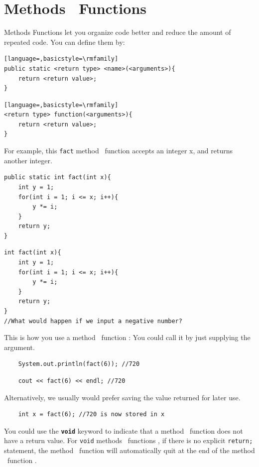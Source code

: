 \section{\if{} Methods \else ~Functions \fi}
\label{sec:functions}

\if{} Methods \else Functions \fi let you organize code better and reduce the amount of repeated code. You can define them by:

\if{}
\begin{lstlisting}[language=,basicstyle=\rmfamily]
public static <return type> <name>(<arguments>){
    return <return value>;
}
\end{lstlisting}
\else
\begin{lstlisting}[language=,basicstyle=\rmfamily]
<return type> function(<arguments>){
    return <return value>;
}
\end{lstlisting}
\fi

For example, this \texttt{fact}\if{} method \else ~function \fi accepts an integer x, and returns another integer.
\if{}
\begin{lstlisting}
public static int fact(int x){
    int y = 1;
    for(int i = 1; i <= x; i++){
        y *= i;
    }
    return y;
}
\end{lstlisting}
\else
\begin{lstlisting}
int fact(int x){
    int y = 1;
    for(int i = 1; i <= x; i++){
        y *= i;
    }
    return y;
}
//What would happen if we input a negative number?
\end{lstlisting}
\fi

This is how you use a\if{} method \else ~function \fi: 
You could call it by just supplying the argument.

\if{}
\begin{lstlisting}
    System.out.println(fact(6)); //720
\end{lstlisting}
\else
\begin{lstlisting}
    cout << fact(6) << endl; //720
\end{lstlisting}
\fi

Alternatively, we usually would prefer saving the value returned for later use.

\begin{lstlisting}
    int x = fact(6); //720 is now stored in x
\end{lstlisting}

You could use the \texttt{\textbf{void}} keyword to indicate that a\if{} method \else ~function \fi does not have a return value. For \texttt{void}\if{} methods \else ~functions \fi, if there is no explicit \texttt{return;} statement, the\if{} method \else ~function \fi will automatically quit at the end of the\if{} method \else ~function \fi. 

